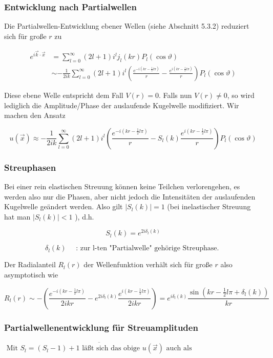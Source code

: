 \documentclass[10pt, letterpaper]{article}
\begin{document}
\subsubsection*{Entwicklung nach Partialwellen}
Die Partialwellen-Entwicklung ebener Wellen (siehe Abschnitt 5.3.2) reduziert sich für große $r$ zu

$$
\begin{aligned}
e^{i \vec{k} \cdot \vec{x}} & =\sum_{l=0}^{\infty}(2 l+1) i^{l} j_{l}(k r) P_{l}(\cos \vartheta) \\
& \sim-\frac{1}{2 i k} \sum_{l=0}^{\infty}(2 l+1) i^{l}\left(\frac{e^{-i\left(k r-\frac{1}{2} l \pi\right)}}{r}-\frac{e^{i\left(k r-\frac{1}{2} l \pi\right)}}{r}\right) P_{l}(\cos \vartheta)
\end{aligned}
$$

Diese ebene Welle entspricht dem Fall $V(r)=0$. Falls nun $V(r) \neq 0$, so wird lediglich die Amplitude/Phase der auslaufende Kugelwelle modifiziert. Wir machen den Ansatz

$$
u(\vec{x}) \approx-\frac{1}{2 i k} \sum_{l=0}^{\infty}(2 l+1) i^{l}\left(\frac{e^{-i\left(k r-\frac{1}{2} l \pi\right)}}{r}-S_{l}(k) \frac{e^{i\left(k r-\frac{1}{2} l \pi\right)}}{r}\right) P_{l}(\cos \vartheta)
$$

\subsubsection*{Streuphasen}
Bei einer rein elastischen Streuung können keine Teilchen verlorengehen, es werden also nur die Phasen, aber nicht jedoch die Intensitäten der auslaufenden Kugelwelle geändert werden. Also gilt $\left|S_{l}(k)\right|=1$ (bei inelastischer Streuung hat man $\left|S_{l}(k)\right|<1$ ), d.h.

$$
S_{l}(k)=e^{2 i \delta_{l}(k)}
$$

$$
\delta_{l}(k) \quad \text { : zur l-ten "Partialwelle" gehörige Streuphase. }
$$

Der Radialanteil $R_{l}(r)$ der Wellenfunktion verhält sich für große $r$ also asymptotisch wie

$$
R_{l}(r) \sim-\left(\frac{e^{-i\left(k r-\frac{1}{2} l \pi\right)}}{2 i k r}-e^{2 i \delta_{l}(k)} \frac{e^{i\left(k r-\frac{1}{2} l \pi\right)}}{2 i k r}\right)=e^{i \delta_{l}(k)} \frac{\sin \left(k r-\frac{1}{2} l \pi+\delta_{l}(k)\right)}{k r}
$$

\subsubsection*{Partialwellenentwicklung für Streuamplituden}
$\overline{\text { Mit } S_{l}=\left(S_{l}-1\right)+1 \text { läßt sich das obige } u(\vec{x}) \text { auch als }}$
\end{document}
